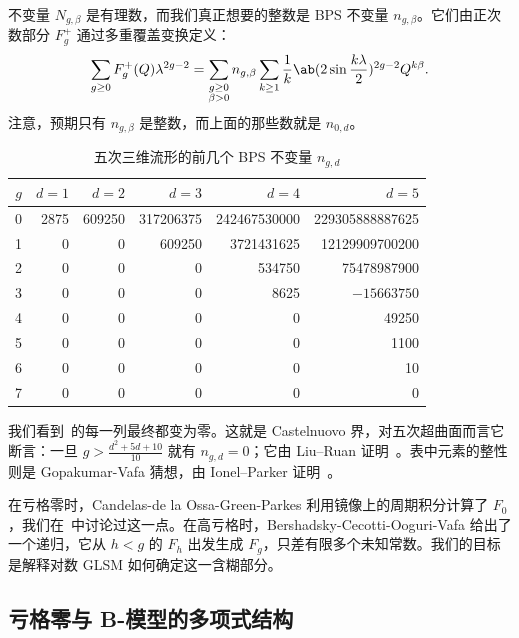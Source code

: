 \documentclass{amsart}
\theoremstyle{definition}
\theoremstyle{remark}
\theoremstyle{plain}
\theoremstyle{definition}
\theoremstyle{remark}
\newcommand{\1}{\mathbf{1}}
\newcommand{\2}{\mathbf{2}}
\newcommand{\3}{\mathbf{3}}
\begin{document}
不变量 \(N_{g,\beta}\) 是有理数，而我们真正想要的整数是 BPS 不变量 \(n_{g,\beta}\)。它们由正次数部分 \(F_g^+\) 通过多重覆盖变换定义：
\[ \sum_{g \geq 0} F_g^+(Q)\lambda^{2g-2} = \sum_{\substack{g \geq 0 \\ \beta > 0}} n_{g,\beta} \sum_{k \geq 1} \frac{1}{k} \ab(2 \sin \frac{k\lambda}{2})^{2g-2}Q^{k\beta}. \]
注意，预期只有 \(n_{g,\beta}\) 是整数，而上面的那些数就是 \(n_{0,d}\)。

\begin{table}[htpb]
    \centering
    \caption{五次三维流形的前几个 BPS 不变量 \(n_{g,d}\)}
    \label{tab:quinticbps}
    \begin{tabular}{crrrrr}
        \toprule
        \(g\) & \(d=1\) & \(d=2\) & \(d=3\) & \(d=4\) & \(d=5\) \\
        \midrule
        0 & 2875 & 609250 & 317206375 & 242467530000 & 229305888887625 \\
        1 & 0 & 0 & 609250 & 3721431625 & 12129909700200 \\
        2 & 0 & 0 & 0 & 534750 & 75478987900 \\
        3 & 0 & 0 & 0 & 8625 & \(-15663750\) \\
        4 & 0 & 0 & 0 & 0 & 49250 \\
        5 & 0 & 0 & 0 & 0 & 1100 \\
        6 & 0 & 0 & 0 & 0 & 10 \\
        7 & 0 & 0 & 0 & 0 & 0 \\
        \bottomrule
    \end{tabular}
\end{table}

我们看到~的每一列最终都变为零。这就是 Castelnuovo 界，对五次超曲面而言它断言：一旦 \(g > \frac{d^2+5d+10}{10}\) 就有 \(n_{g,d} = 0\)；它由 Liu--Ruan 证明~\cite{LiuRuanCastelnuovo}。表中元素的整性则是 Gopakumar-Vafa 猜想，由 Ionel--Parker 证明~\cite{IonelParker2018}。

在亏格零时，Candelas-de la Ossa-Green-Parkes 利用镜像上的周期积分计算了 \(F_0\)，我们在~中讨论过这一点。在高亏格时，Bershadsky-Cecotti-Ooguri-Vafa 给出了一个递归，它从 \(h < g\) 的 \(F_h\) 出发生成 \(F_g\)，只差有限多个未知常数。我们的目标是解释对数 GLSM 如何确定这一含糊部分。

\subsection{亏格零与 B-模型的多项式结构}%
\label{sub:Genus zero and the polynomial structure of the B-model}
\end{document}
